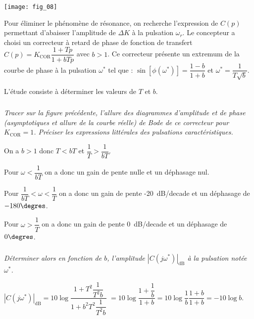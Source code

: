\begin{multicols}{2}
\ifprof
\else
\begin{center}
\texttt{[image: fig\_08]}
\end{center}
\fi

 \ifprof
 \else
Pour éliminer le phénomène de résonance, on recherche l’expression de $C(p)$ permettant d’abaisser
l’amplitude de $\Delta K$ à la pulsation $\omega_r$. Le concepteur a choisi un correcteur à retard de phase de fonction de
transfert $C(p)=K_{\text{COR}} \dfrac{1+Tp}{1+bTp}$ avec $b>1$. Ce correcteur présente un extremum de la courbe de phase à la pulsation $\omega^{*}$ tel que : $\sin\left[\phi\left(\omega^{*}\right)\right]=\dfrac{1-b}{1+b}$ et $\omega^{*}=\dfrac{1}{T\sqrt{b}}$.


L’étude consiste à déterminer les valeurs de $T$ et $b$.

\fi

\subparagraph{}\textit{Tracer sur la figure précédente, l'allure des diagrammes d’amplitude et de phase (asymptotiques et allure
de la courbe réelle) de Bode de ce correcteur pour $K_{\text{COR}} =1$. Préciser les expressions littérales des
pulsations caractéristiques.}
\ifprof
\begin{corrige}
On a  $b>1$ donc $T<bT$ et $\dfrac{1}{T}>\dfrac{1}{bT}$. 

Pour $\omega<\dfrac{1}{bT}$ on a donc un gain de pente nulle et un déphasage nul. 

Pour $\dfrac{1}{bT}<\omega<\dfrac{1}{T}$ on a donc un gain de pente -\SI{20}{dB/decade} et un déphasage de $-180\degres$. 

Pour $\omega>\dfrac{1}{T}$ on a donc un gain de pente \SI{0}{dB/decade} et un déphasage de $0\degres$. 

\end{corrige}

\else
\fi


\subparagraph{}\textit{Déterminer alors en fonction de $b$, l'amplitude $\left| C\left(j\omega^{*}\right)\right|_{\text{dB}}$ à la pulsation notée $\omega^{*}$. }
\ifprof
\begin{corrige}
 $\left| C\left(j\omega^{*}\right)\right|_{\text{dB}}= 10\log \dfrac{1+T^2 \dfrac{1}{T^2b}}{1+b^2T^2 \dfrac{1}{T^2b}}$ $= 10\log \dfrac{1+ \dfrac{1}{b}}{1+b}= 10\log \dfrac{1}{b}\dfrac{1+ b}{1+b}=-10\log b$.
\end{corrige}
\else
\fi




\end{multicols}
